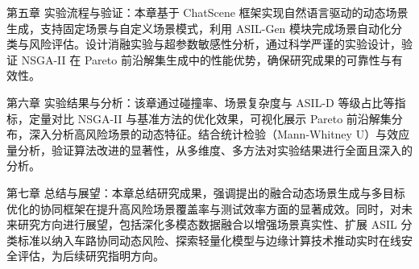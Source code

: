 第五章 实验流程与验证：本章基于 ChatScene 框架实现自然语言驱动的动态场景生成，支持固定场景与自定义场景模式，利用 ASIL-Gen 模块完成场景自动化分类与风险评估。设计消融实验与超参数敏感性分析，通过科学严谨的实验设计，验证 NSGA-II 在 Pareto 前沿解集生成中的性能优势，确保研究成果的可靠性与有效性。

第六章 实验结果与分析：该章通过碰撞率、场景复杂度与 ASIL-D 等级占比等指标，定量对比 NSGA-II 与基准方法的优化效果，可视化展示 Pareto 前沿解集分布，深入分析高风险场景的动态特征。结合统计检验（Mann-Whitney U）与效应量分析，验证算法改进的显著性，从多维度、多方法对实验结果进行全面且深入的分析。

第七章 总结与展望：本章总结研究成果，强调提出的融合动态场景生成与多目标优化的协同框架在提升高风险场景覆盖率与测试效率方面的显著成效。同时，对未来研究方向进行展望，包括深化多模态数据融合以增强场景真实性、扩展 ASIL 分类标准以纳入车路协同动态风险、探索轻量化模型与边缘计算技术推动实时在线安全评估，为后续研究指明方向。
